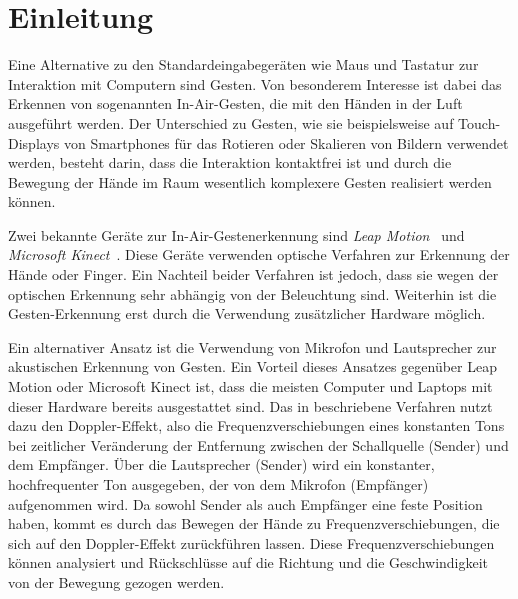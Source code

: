 \section{Einleitung}
\label{sec:intro}
Eine Alternative zu den Standardeingabegeräten wie Maus und Tastatur zur
Interaktion mit Computern sind Gesten.
Von besonderem Interesse ist dabei das Erkennen von sogenannten \glqq
In-Air\grqq -Gesten, die mit den Händen in der Luft ausgeführt werden. Der
Unterschied zu Gesten, wie sie beispielsweise auf Touch-Displays von Smartphones
für das Rotieren oder Skalieren von Bildern verwendet werden, besteht darin,
dass die Interaktion kontaktfrei ist und durch die Bewegung der Hände im Raum
wesentlich komplexere Gesten realisiert werden können.

Zwei bekannte Geräte zur In-Air-Gestenerkennung sind \textit{Leap
Motion}~\cite{LeapMotion} und \textit{Microsoft Kinect}~\cite{Kinect}. Diese Geräte
verwenden optische Verfahren zur Erkennung der Hände oder Finger. Ein Nachteil
beider Verfahren ist jedoch, dass sie wegen der optischen Erkennung sehr
abhängig von der Beleuchtung sind. Weiterhin ist die Gesten-Erkennung erst durch
die Verwendung zusätzlicher Hardware möglich.

Ein alternativer Ansatz ist die Verwendung von Mikrofon und Lautsprecher zur
akustischen Erkennung von Gesten. Ein Vorteil dieses Ansatzes gegenüber Leap
Motion oder Microsoft Kinect ist, dass die meisten Computer und Laptops mit
dieser Hardware bereits ausgestattet sind.
Das in \cite{Gupta2012} beschriebene Verfahren nutzt dazu den Doppler-Effekt,
also die Frequenzverschiebungen eines konstanten Tons bei zeitlicher Veränderung
der Entfernung zwischen der Schallquelle (Sender) und dem Empfänger.
Über die Lautsprecher (Sender) wird ein konstanter, hochfrequenter Ton
ausgegeben, der von dem Mikrofon (Empfänger) aufgenommen wird.
Da sowohl Sender als auch Empfänger eine feste Position haben, kommt es durch
das Bewegen der Hände zu Frequenzverschiebungen, die sich auf den Doppler-Effekt
zurückführen lassen. 
Diese Frequenzverschiebungen können analysiert und Rückschlüsse auf die Richtung
und die Geschwindigkeit von der Bewegung gezogen werden.


